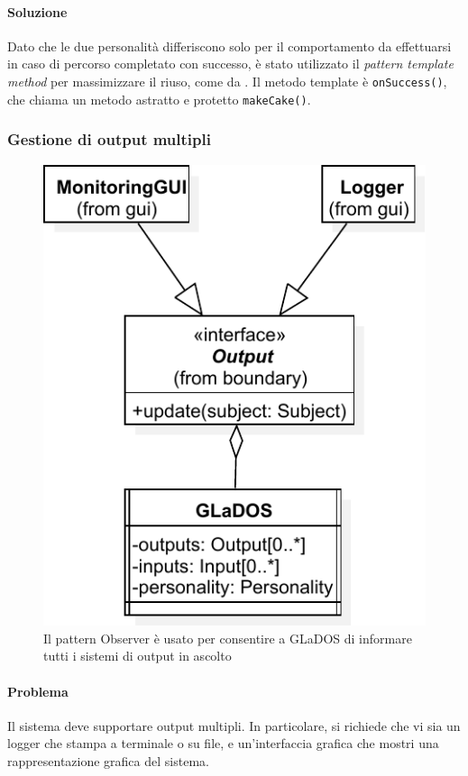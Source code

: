 \documentclass[a4paper,12pt]{report}
\begin{document}
\paragraph{Soluzione} Dato che le due personalità differiscono solo per il comportamento da effettuarsi in caso di percorso completato con successo,
è stato utilizzato il \textit{pattern template method} per massimizzare il riuso, come da .
Il metodo template è \texttt{onSuccess()}, che chiama un metodo astratto e protetto
\texttt{makeCake()}.

\subsubsection{Gestione di output multipli}

\begin{figure}[H]
\centering{}
\includegraphics[width=.7\textwidth]{img/observer}
\caption{Il pattern Observer è usato per consentire a GLaDOS di informare tutti i sistemi di output in ascolto}
\label{img:observer}
\end{figure}

\paragraph{Problema} Il sistema deve supportare output multipli. In particolare, si richiede che vi sia un logger che stampa a terminale o su file,
e un'interfaccia grafica che mostri una rappresentazione grafica del sistema.
\end{document}
